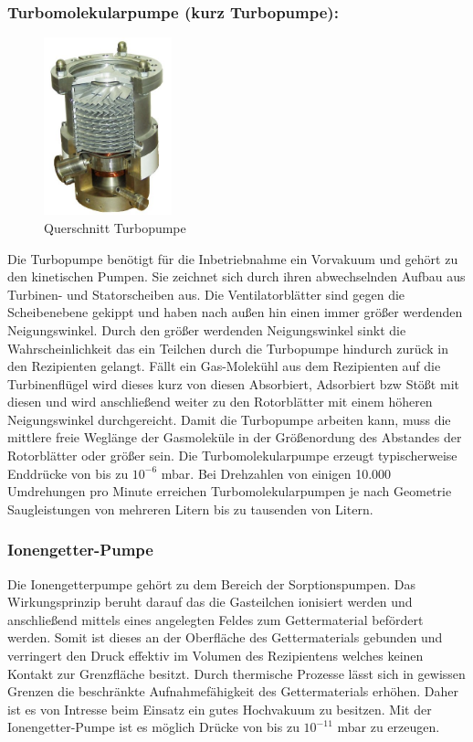 \subsubsection{Turbomolekularpumpe (kurz Turbopumpe):}
\begin{figure}
    \vspace{-1cm}
    \centering
    \includegraphics[width=0.33\textwidth]{./picture/Turbo.jpg}
    \caption{Querschnitt Turbopumpe \cite{Turbo}}
    \label{fig:Turbo}
    \vspace{-0.5cm}
\end{figure}
Die Turbopumpe benötigt für die Inbetriebnahme ein Vorvakuum und gehört zu den kinetischen Pumpen. Sie zeichnet sich durch ihren abwechselnden Aufbau aus Turbinen-  und Statorscheiben aus. Die Ventilatorblätter sind gegen die Scheibenebene gekippt und haben nach außen hin einen immer größer werdenden Neigungswinkel. Durch den größer werdenden Neigungswinkel sinkt die Wahrscheinlichkeit das ein Teilchen durch die Turbopumpe hindurch zurück in den Rezipienten gelangt. Fällt ein Gas-Molekühl aus dem Rezipienten auf die Turbinenflügel wird dieses kurz von diesen Absorbiert, Adsorbiert bzw Stößt mit diesen und wird anschließend weiter zu den Rotorblätter mit einem höheren Neigungswinkel durchgereicht. Damit die Turbopumpe arbeiten kann, muss die mittlere freie Weglänge der Gasmoleküle in der Größenordung des Abstandes der Rotorblätter oder größer sein. Die Turbomolekularpumpe erzeugt typischerweise Enddrücke von bis zu $10^{-6}$ mbar. Bei Drehzahlen von einigen 10.000 Umdrehungen pro Minute erreichen Turbomolekularpumpen je nach Geometrie Saugleistungen von mehreren Litern bis zu tausenden von Litern.

\subsubsection{Ionengetter-Pumpe}
Die Ionengetterpumpe gehört zu dem Bereich der Sorptionspumpen. Das Wirkungsprinzip beruht darauf das die Gasteilchen ionisiert werden und anschließend mittels eines angelegten Feldes zum Gettermaterial befördert werden. Somit ist dieses an der Oberfläche des Gettermaterials gebunden und verringert den Druck effektiv im Volumen des Rezipientens welches keinen Kontakt zur Grenzfläche besitzt. Durch thermische Prozesse lässt sich in gewissen Grenzen die beschränkte Aufnahmefähigkeit des Gettermaterials erhöhen. Daher ist es von Intresse beim Einsatz ein gutes Hochvakuum zu besitzen. Mit der Ionengetter-Pumpe ist es möglich Drücke von bis zu $10^{-11}$ mbar zu erzeugen.

